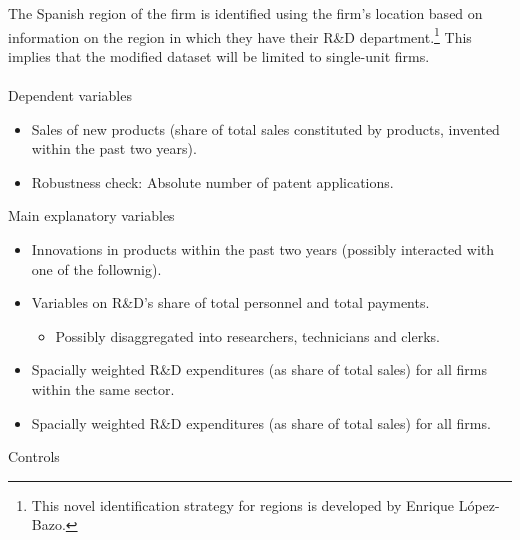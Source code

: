 \label{sec:data}
The Spanish region of the firm is identified using the firm's location based on information on the region in which they have their R\&D department.\footnote{This novel identification strategy for regions is developed by Enrique López-Bazo.} This implies that the modified dataset will be limited to single-unit firms.
\\
\\
Dependent variables
\begin{itemize}
  \item Sales of new products (share of total sales constituted by products, invented within the past two years).
  \item Robustness check: Absolute number of patent applications.
\end{itemize}
Main explanatory variables
\begin{itemize}
  \item Innovations in products within the past two years (possibly interacted with one of the follownig).
  \item Variables on R\&D’s share of total personnel and total payments.
  \begin{itemize}
    \item Possibly disaggregated into researchers, technicians and clerks.
  \end{itemize}
  \item Spacially weighted R\&D expenditures (as share of total sales) for all firms within the same sector.
  \item Spacially weighted R\&D expenditures (as share of total sales) for all firms.
\end{itemize}
Controls
